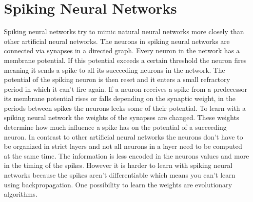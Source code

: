 \section{Spiking Neural Networks}
\label{sec:spiking}
Spiking neural networks try to mimic natural neural networks more closely than other artificial neural networks.
The neurons in spiking neural networks are connected via synapses in a directed graph.
Every neuron in the network has a membrane potential.
If this potential exceeds a certain threshold the neuron fires meaning it sends a spike to all its succeeding neurons in the network.
The potential of the spiking neuron is then reset and it enters a small refractory period in which it can't fire again.
If a neuron receives a spike from a predecessor its membrane potential rises or falls depending on the synaptic weight, in the periods between spikes the neurons leeks some of their potential.
To learn with a spiking neural network the weights of the synapses are changed.
These weights determine how much influence a spike has on the potential of a succeeding neuron.
In contrast to other artificial neural networks the neurons don't have to be organized in strict layers and not all neurons in a layer need to be computed at the same time.
The information is less encoded in the neurons values and more in the timing of the spikes.
However it is harder to learn with spiking neural networks because the spikes aren't differentiable which means you can't learn using backpropagation.
One possibility to learn the weights are evolutionary algorithms.
